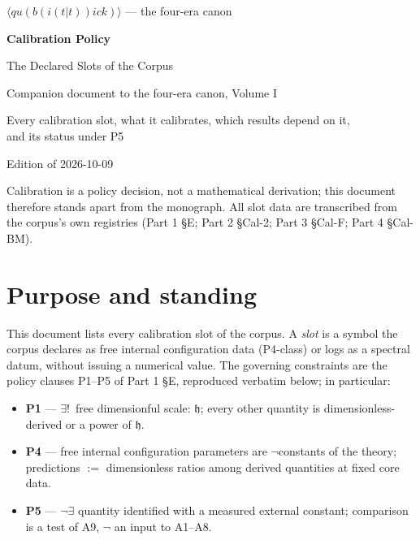 \documentclass[11pt,openany]{report}
\theoremstyle{canonplain}
\theoremstyle{canondef}
\begin{document}
\begin{titlepage}
\centering
\vspace*{2.6cm}
{\LARGE $\langle qu(b(i(t|t))ick)\rangle$ — the four-era canon\par}
\vspace{0.8cm}
{\Huge\bfseries Calibration Policy\par}
\vspace{0.5cm}
{\LARGE The Declared Slots of the Corpus\par}
\vspace{1.0cm}
{\large Companion document to the four-era canon, Volume I\par}
\vspace{0.4cm}
{\large Every calibration slot, what it calibrates, which results depend on it,\\ and its status under P5\par}
\vfill
{\large Edition of 2026-10-09\par}
\vspace{0.3cm}
{\small Calibration is a policy decision, not a mathematical derivation; this document therefore stands apart from the monograph. All slot data are transcribed from the corpus's own registries (Part 1 §E; Part 2 §Cal-2; Part 3 §Cal-F; Part 4 §Cal-BM).\par}
\end{titlepage}

\tableofcontents

\section*{\texorpdfstring{Purpose and standing}{Purpose and standing}}

This document lists every calibration slot of the corpus. A \emph{slot} is a
symbol the corpus declares as free internal configuration data (P4-class) or
logs as a spectral datum, without issuing a numerical value. The governing
constraints are the policy clauses P1--P5 of Part 1 \S E, reproduced verbatim
below; in particular:

\begin{itemize}
\item \textbf{P1} --- $\exists!\,$ free dimensionful scale: $\mathfrak h$; every
  other quantity is dimensionless-derived or a power of $\mathfrak h$.
\item \textbf{P4} --- free internal configuration parameters are
  $\neg$constants of the theory; predictions $:=$ dimensionless ratios among
  derived quantities at fixed core data.
\item \textbf{P5} --- $\neg\exists$ quantity identified with a measured
  external constant; comparison is a test of A9, $\neg$ an input to A1--A8.
\end{itemize}
\end{document}
